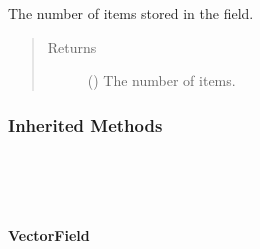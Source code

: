 \documentclass[letterpaper,10pt,english]{sphinxmanual}
\begin{document}
\begin{fulllineitems}
\begin{fulllineitems}
\label{\detokenize{api/generated/directional_clustering.fields.Field.size:directional_clustering.fields.Field.size}}
The number of items stored in the field.
\begin{quote}\begin{description}
\item[{Returns}] \leavevmode
{} () \textendash{} The number of items.

\end{description}\end{quote}

\end{fulllineitems}

\subsubsection*{Inherited Methods}


\begin{savenotes}\sphinxatlongtablestart\begin{longtable}[c]{}
\hline

\endfirsthead

%
{}\\
\hline

\endhead

\hline
{}\\
\endfoot

\endlastfoot

\end{longtable}\sphinxatlongtableend\end{savenotes}

\end{fulllineitems}



\paragraph{VectorField}
\label{\detokenize{api/generated/directional_clustering.fields.VectorField:vectorfield}}\label{\detokenize{api/generated/directional_clustering.fields.VectorField::doc}}
\end{document}
